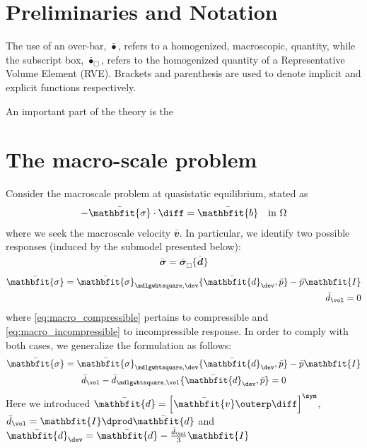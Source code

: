 \documentclass[a4paper,11pt]{article}
\renewcommand{\ta}[1]{\mathbfit{#1}}
\renewcommand{\ts}[1]{\mathbfit{#1}}
\renewcommand{\Box}{\mdlgwhtsquare}
\begin{document}
\section{Preliminaries and Notation}\label{sec:preliminaries}
The use of an over-bar, $\bar{\bullet}$, refers to a homogenized, macroscopic, quantity, while the subscript box, $\bar{\bullet}_\Box$, refers to the homogenized quantity of a Representative Volume Element (RVE). Brackets and parenthesis are used to denote implicit and explicit functions respectively.

An important part of the theory is the

\section{The macro-scale problem} \label{sec:macro}
Consider the macroscale problem at quasistatic equilibrium, stated as
\begin{align}
 -\bar{\ts\sigma}\cdot \diff = \bar{\ts b} \quad \text{in } \Omega
\end{align}
where we seek the macroscale velocity $\bar{\ts v}$. In particular, we identify two possible responses (induced by the submodel presented below):
\begin{gather}
 \bar{\ts\sigma} = \bar{\ts\sigma}_\Box\{\bar{\ts d}\} \label{eq:macro_compressible}
\end{gather}
\vspace{-2\baselineskip} %
\begin{subequations} \label{eq:macro_incompressible}
\begin{align}
  \bar{\ts\sigma} = \bar{\ts\sigma}_{\Box,\dev}\{\bar{\ts d}_\dev, \bar p\} - \bar p \ts I\\
  \bar{d}_\vol = 0
\end{align}
\end{subequations}
where \eqref{eq:macro_compressible} pertains to compressible and \eqref{eq:macro_incompressible} to incompressible response.
In order to comply with both cases, we generalize the formulation as follows:
\begin{subequations} \label{eq:macro_mixed}
\begin{gather}
 \bar{\ts\sigma} = \bar{\ts\sigma}_{\Box,\dev}\{\bar{\ts d}_\dev,\bar p\} - \bar p\ts I\\
 \bar{d}_\vol - \bar{d}_{\Box,\vol}\{\bar{\ts d}_\dev, \bar p\} = 0
\end{gather}
\end{subequations}
Here we introduced $\bar{\ts d} = \left[ \bar{\ta v} \outerp \diff \right]^\sym$, $\bar{d}_\vol = \ts I \dprod \bar{\ts d}$ and $\bar{\ts d}_\dev = \bar{\ts d} - \frac{\bar d_\vol}{3}\ts I$ 
\end{document}

